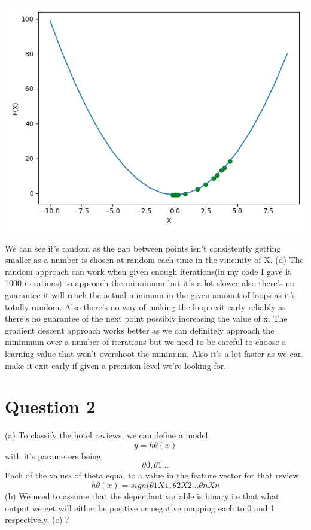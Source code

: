 \documentclass[11pt]{article} %
\begin{document}
\begin{center}
\includegraphics[scale = 0.5]{r2.png}
\end{center}
We can see it's random as the gap between points isn't consistently getting smaller as a number is chosen at random each time in the vincinity of X.
\newline
\newline
(d)
\newline
The random approach can work when given enough iterations(in my code I gave it 1000 iterations) to approach the minnimum but it's a lot slower also there's no guarantee it will reach the actual minimum in the given amount of loops as it's totally random. Also there's no way of making the loop exit early reliably as there's no guarantee of the next point possibly increasing the value of x. The gradient descent approach works better as we can definitely approach the mininmum over a number of iterations but we need to be careful to choose a learning value that won't overshoot the minimum. Also it's a lot faster as we can make it exit early if given a precision level we're looking for.

\section{Question 2}
(a) 
\newline
To classify the hotel reviews, we can define a model 
\[y = h\theta(x) \]
with it's parameters being 
\[\theta0,\theta1...\]
Each of the values of theta equal to a value in the feature vector for that review.
\[h\theta(x) = sign(\theta1X1,\theta2X2... \theta nXn\]
\newline
(b)
\newline
We need to assume that the dependant variable is binary i.e that what output we get will either be positive or negative mapping each to 0 and 1 respectively.
\newline
(c)
\newline
?
\end{document}
